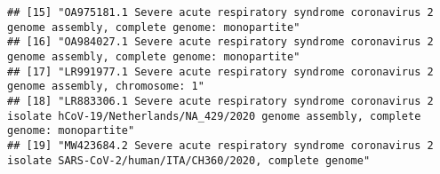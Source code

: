 \documentclass[
]{article}
\begin{document}
\begin{verbatim}
## [15] "OA975181.1 Severe acute respiratory syndrome coronavirus 2 genome assembly, complete genome: monopartite"                                                                                                                                                                                                                                                                                                                                                                                                                         
## [16] "OA984027.1 Severe acute respiratory syndrome coronavirus 2 genome assembly, complete genome: monopartite"                                                                                                                                                                                                                                                                                                                                                                                                                         
## [17] "LR991977.1 Severe acute respiratory syndrome coronavirus 2 genome assembly, chromosome: 1"                                                                                                                                                                                                                                                                                                                                                                                                                                        
## [18] "LR883306.1 Severe acute respiratory syndrome coronavirus 2 isolate hCoV-19/Netherlands/NA_429/2020 genome assembly, complete genome: monopartite"                                                                                                                                                                                                                                                                                                                                                                                 
## [19] "MW423684.2 Severe acute respiratory syndrome coronavirus 2 isolate SARS-CoV-2/human/ITA/CH360/2020, complete genome"                                                                                                                                                                                                                                                                                                                                                                                                              

\end{verbatim}
\end{document}
